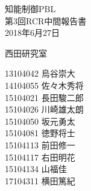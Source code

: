 \begin{titlepage}

  \vspace*{25mm}

  \begin{center}
    {\huge 知能制御PBL\\}
    \vspace{10mm}
    {\Huge 第3回RCR中間報告書\\}
    \vspace{20mm}
    {\Large 2018年6月27日}

    \vspace{15mm}

    {\LARGE 西田研究室\\}

    \vspace{15mm}

    {\Large
   13104042 烏谷崇大　\\
   14104055 佐々木秀将\\
   15104021 長田駿二郎\\
   15104026 川崎雄太朗\\
   15104050 坂元勇太　\\
   15104081 徳野将士　\\
   15104113 前田修一　\\
   15104117 右田明花　\\
   15104134 山福佳　　\\
   17104311 横田篤紀　\\
}

  \end{center}

\end{titlepage}
